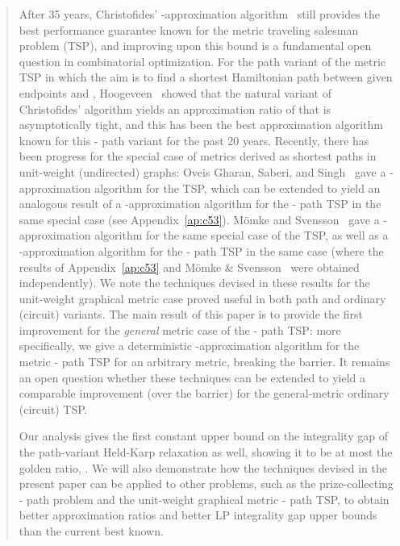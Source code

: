 \documentclass[11pt,letterpaper]{article}
\newcommand{\st}{\mbox{-} }
\begin{document}
\begin{quote}
After 35 years, Christofides' -approximation algorithm~\cite{C} still provides the best performance guarantee known for the metric traveling salesman problem (TSP), and improving upon this bound is a fundamental open question in combinatorial optimization. For the path variant of the metric TSP in which the aim is to find a shortest Hamiltonian path between given endpoints  and , Hoogeveen~\cite{H} showed that the natural variant of Christofides' algorithm yields an approximation ratio of  that is asymptotically tight, and this has been the best approximation algorithm known for this \st path variant for the past 20 years. Recently, there has been progress for the special case of metrics derived as shortest paths in unit-weight (undirected) graphs: Oveis Gharan, Saberi, and Singh~\cite{OSS} gave a -approximation algorithm for the TSP, which can be extended to yield an analogous result of a -approximation algorithm for the \st path TSP in the same special case (see Appendix~\ref{ap:c53}). M\"omke and Svensson~\cite{MS} gave a -approximation algorithm for the same special case of the TSP, as well as a -approximation algorithm for the \st path TSP in the same case (where the results of Appendix~\ref{ap:c53} and M\"omke \& Svensson~\cite{MS} were obtained independently). We note the techniques devised in these results for the unit-weight graphical metric case proved useful in both path and ordinary (circuit) variants. The main result of this paper is to provide the first improvement for the \emph{general} metric case of the \st path TSP: more specifically, we give a deterministic -approximation algorithm for the metric \st path TSP for an arbitrary metric, breaking the  barrier. It remains an open question whether these techniques can be extended to yield a comparable improvement (over the  barrier) for the general-metric ordinary (circuit) TSP.

Our analysis gives the first constant upper bound on the integrality gap of the path-variant Held-Karp relaxation as well, showing it to be at most the golden ratio, . We will also demonstrate how the techniques devised in the present paper can be applied to other problems, such as the prize-collecting \st path problem and the unit-weight graphical metric \st path TSP, to obtain better approximation ratios and better LP integrality gap upper bounds than the current best known.


\end{quote}
\end{document}
